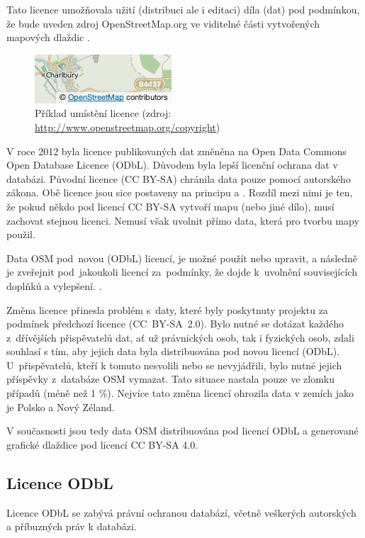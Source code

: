 Tato licence umožňovala užití (distribuci ale i editaci) díla (dat) pod podmínkou,
že bude uveden zdroj OpenStreetMap.org ve viditelné části
vytvořených mapových dlaždic \cite{OSMlicence}.

  \begin{figure}[hbt]
    \centering
      \includegraphics[scale=0.75]{./pictures/attribution_example.png}
      \caption{Příklad umístění licence 
                (zdroj: \url{http://www.openstreetmap.org/copyright})}
      \label{fig:attribution_example}
  \end{figure} 

V roce 2012 byla licence publikovaných dat změněna na Open Data Commons
Open Database Licence (ODbL).
Důvodem byla lepší licenční ochrana dat v databázi. 
Původní licence (CC BY-SA) chránila data pouze pomocí autorského zákona. 
Obě licence jsou sice postaveny na principu  a . Rozdíl mezi nimi je ten, že pokud někdo pod licencí CC BY-SA vytvoří mapu (nebo jiné dílo), musí zachovat stejnou licenci.
Nemusí však uvolnit přímo data, která pro tvorbu mapy použil.

Data OSM pod~novou (ODbL) licencí, je možné použít nebo upravit,
a následně je zveřejnit pod~jakoukoli licencí za~podmínky, že dojde k~uvolnění souvisejících doplňků a vylepšení. \cite{OSMlicenceChange}.

Změna licence přinesla problém
s~daty, které byly poskytnuty projektu za podmínek předchozí licence
(CC~BY-SA~2.0). Bylo nutné se dotázat každého z~dřívějších
přispěvatelů dat, ať už právnických osob, tak i fyzických osob,
zdali souhlasí s tím, aby jejich data byla distribuována pod novou licencí (ODbL).
U~přispěvatelů, kteří k tomuto nesvolili nebo se nevyjádřili,
bylo nutné jejich příspěvky z~databáze OSM vymazat.
Tato situace nastala pouze ve zlomku případů (méně než 1 \%).
Nejvíce tato změna licencí ohrozila data v zemích jako je Polsko a Nový Zéland. \cite {OSMlicenceIssue}

V současnosti jsou tedy data OSM distribuována pod licencí ODbL a
generované grafické dlaždice pod licencí CC BY-SA 4.0. \cite{OSMlicence}

\subsection{Licence ODbL}
Licence ODbL
se zabývá právní ochranou databází, včetně
veškerých autorských a příbuzných práv k databázi.

